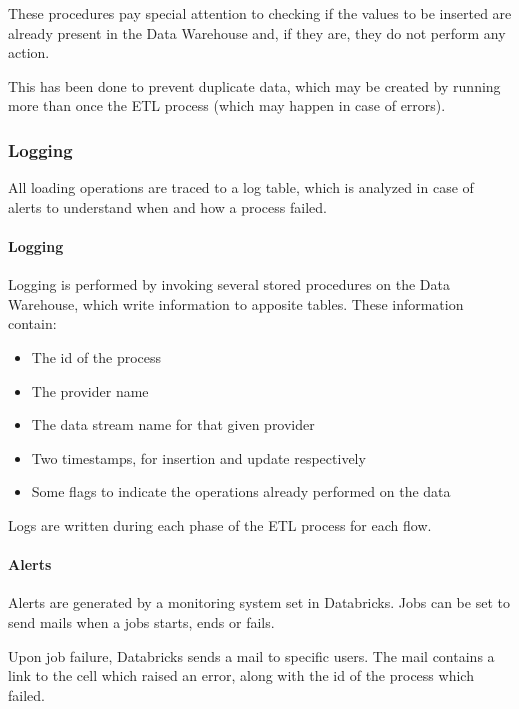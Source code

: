             These procedures pay special attention to checking if the values to be inserted are already present in the Data Warehouse and, if they are, they do not perform any action.
            
            This has been done to prevent duplicate data, which may be created by running more than once the ETL process (which may happen in case of errors).
            
    \subsubsection{Logging} \label{section:etl:logging}
        All loading operations are traced to a log table, which is analyzed in case of alerts to understand when and how a process failed.
        
        \paragraph{Logging}
            Logging is performed by invoking several stored procedures on the Data Warehouse, which write information to apposite tables.
            These information contain:
                \begin{itemize}
                    \item The id of the process
                    \item The provider name
                    \item The data stream name for that given provider
                    \item Two timestamps, for insertion and update respectively
                    \item Some flags to indicate the operations already performed on the data
                \end{itemize}
            
            Logs are written during each phase of the ETL process for each flow.
        
        \paragraph{Alerts}
            Alerts are generated by a monitoring system set in Databricks.
            Jobs can be set to send mails when a jobs starts, ends or fails.
            
            Upon job failure, Databricks sends a mail to specific users.
            The mail contains a link to the cell which raised an error, along with the id of the process which failed.
            

